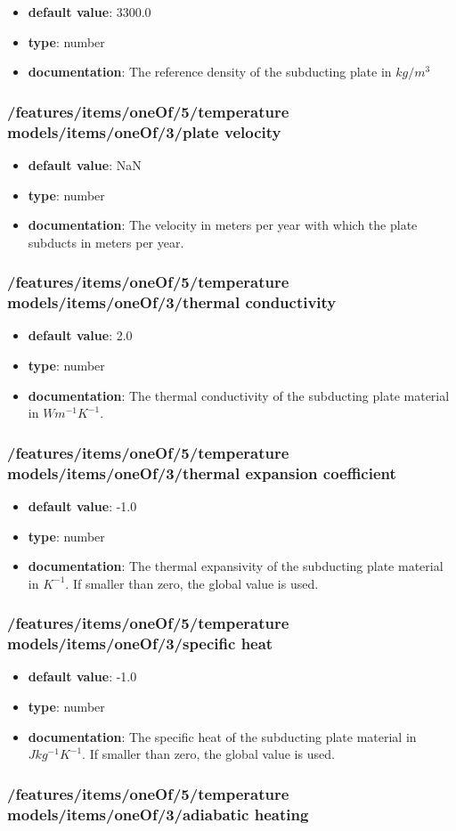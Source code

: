 \begin{itemize}\item {\bf default value}: 3300.0
\item {\bf type}: number
\item {\bf documentation}: The reference density of the subducting plate in $kg/m^3$
\end{itemize}\subsubsection{/features/items/oneOf/5/temperature models/items/oneOf/3/plate velocity}
\begin{itemize}\item {\bf default value}: NaN
\item {\bf type}: number
\item {\bf documentation}: The velocity in meters per year with which the plate subducts in meters per year.
\end{itemize}\subsubsection{/features/items/oneOf/5/temperature models/items/oneOf/3/thermal conductivity}
\begin{itemize}\item {\bf default value}: 2.0
\item {\bf type}: number
\item {\bf documentation}: The thermal conductivity of the subducting plate material in $W m^{-1} K^{-1}$.
\end{itemize}\subsubsection{/features/items/oneOf/5/temperature models/items/oneOf/3/thermal expansion coefficient}
\begin{itemize}\item {\bf default value}: -1.0
\item {\bf type}: number
\item {\bf documentation}: The thermal expansivity of the subducting plate material in $K^{-1}$. If smaller than zero, the global value is used.
\end{itemize}\subsubsection{/features/items/oneOf/5/temperature models/items/oneOf/3/specific heat}
\begin{itemize}\item {\bf default value}: -1.0
\item {\bf type}: number
\item {\bf documentation}: The specific heat of the subducting plate material in $J kg^{-1} K^{-1}$. If smaller than zero, the global value is used.
\end{itemize}\subsubsection{/features/items/oneOf/5/temperature models/items/oneOf/3/adiabatic heating}
